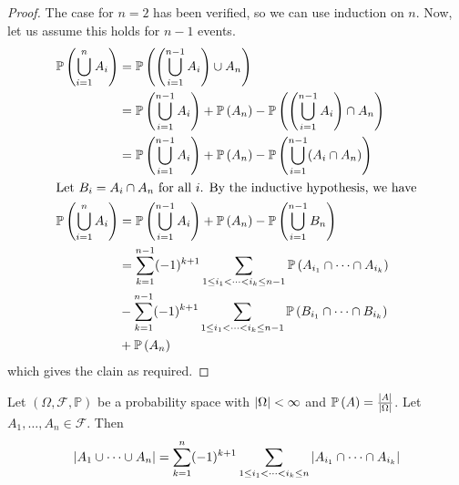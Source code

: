 \documentclass{article}
\begin{document}
\begin{proof}
    The case for $n=2$ has been verified, so we can use induction on $n$. Now, let us assume this holds for $n-1$ events.
    \begin{align*}
        \mathbb{P}\left({\bigcup_{i=1}^n A_i}\right) & = \mathbb{P}\left({\left( \bigcup_{i=1}^{n-1} A_i  \right) \cup A_n}\right)                                                     \\
                                   & = \mathbb{P}\left({\bigcup_{i=1}^{n-1} A_i}\right) + \mathbb{P}\left({A_n}\right) - \mathbb{P}\left({\left( \bigcup_{i=1}^{n-1} A_i  \right) \cap A_n}\right)       \\
                                   & = \mathbb{P}\left({\bigcup_{i=1}^{n-1} A_i}\right) + \mathbb{P}\left({A_n}\right) - \mathbb{P}\left({\bigcup_{i=1}^{n-1} (A_i \cap A_n)}\right)                     \\
        \intertext{Let $B_i = A_i \cap A_n$ for all $i$. By the inductive hypothesis, we have}
        \mathbb{P}\left({\bigcup_{i=1}^n A_i}\right) & = \mathbb{P}\left({\bigcup_{i=1}^{n-1} A_i}\right) + \mathbb{P}\left({A_n}\right) - \mathbb{P}\left({\bigcup_{i=1}^{n-1} B_n}\right)                                \\
                                   & = \sum_{k=1}^{n-1} (-1)^{k+1} \sum_{1 \leq i_1 < \dots < i_k \leq n-1} \mathbb{P}\left({A_{i_1} \cap \dots \cap A_{i_k}}\right) \\&- \sum_{k=1}^{n-1} (-1)^{k+1} \sum_{1 \leq i_1 < \dots < i_k \leq n-1} \mathbb{P}\left({B_{i_1} \cap \dots \cap B_{i_k}}\right) \\ &+ \mathbb{P}\left({A_n}\right)
    \end{align*}
    which gives the clain as required.
\end{proof}

Let $(\Omega, \mathcal F, \mathbb P)$ be a probability space with $\abs{\Omega} < \infty$ and $\mathbb{P}\left({A}\right) = \frac{\abs{A}}{\abs{\Omega}}$. Let $A_1, \dots, A_n \in \mathcal F$. Then
\[ \abs{A_1 \cup \dots \cup A_n} = \sum_{k=1}^n (-1)^{k+1} \sum_{1 \leq i_1 < \dots < i_k \leq n} \abs{A_{i_1} \cap \dots \cap A_{i_k}} \]
\end{document}
